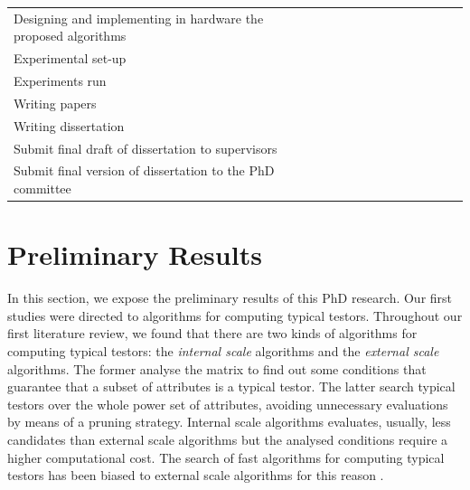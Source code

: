 \documentclass[authoryear,11pt]{elsarticle}
\begin{document}
\begin{table}[h!]
\begin{tabular}{|p{8cm}|c|c|c|c|c|c|c|c|c|c|c|c|}
		&&&&&&&\cellcolor[gray]{0.9}&\cellcolor[gray]{0.9}&\cellcolor[gray]{0.9}&&&\\
		\hline
		Designing and implementing in hardware the proposed algorithms
		&&&&&&&&\cellcolor[gray]{0.9}&\cellcolor[gray]{0.9}&&&\\
		\hline
		Experimental set-up &\cellcolor{blue}&\cellcolor{blue}&&\cellcolor[gray]{0.9}&
		\cellcolor[gray]{0.9}&&\cellcolor[gray]{0.9}&\cellcolor[gray]{0.9}&&&&\\
		\hline
		Experiments run &&&\cellcolor{blue}&\cellcolor[gray]{0.9}&&\cellcolor[gray]{0.9}&\cellcolor[gray]{0.9}&&
		\cellcolor[gray]{0.9}&&&\\
		\hline
		Writing papers &\cellcolor{blue}&&\cellcolor{blue}&&\cellcolor[gray]{0.9}&&\cellcolor[gray]{0.9}&&
		\cellcolor[gray]{0.9}&&&\\
		\hline
		Writing dissertation &&&&\cellcolor[gray]{0.9}&\cellcolor[gray]{0.9}&\cellcolor[gray]{0.9}&
		\cellcolor[gray]{0.9}&\cellcolor[gray]{0.9}&\cellcolor[gray]{0.9}&&&\\
		\hline
		Submit final draft of dissertation to supervisors &&&&&&&&&&\cellcolor[gray]{0.9}&&\\
		\hline
		Submit final version of dissertation to the PhD committee &&&&&&&&&&&\cellcolor[gray]{0.9}&\\
		\hline
		
 	\end{tabular}             
 \end{table}
 
	  	

\section{Preliminary Results}
	In this section, we expose the preliminary results of this PhD research.
	Our first studies were directed to algorithms for computing typical testors. 
	Throughout our first literature review, we found that there are two kinds of algorithms for computing 
	typical testors: the \emph{internal scale} algorithms and the \emph{external scale} algorithms. 
	The former analyse the matrix to find out some conditions that guarantee that a subset of attributes 
	is a typical testor. The latter search typical testors over the whole power set of attributes, 
	avoiding unnecessary evaluations by means of a pruning strategy. 
	Internal scale algorithms evaluates, usually, less candidates than external scale algorithms but the
	analysed conditions require a higher computational cost. The search of fast algorithms for computing
	typical testors has been biased to external scale algorithms for this reason \citep{Alba14}.
	
\end{document}
